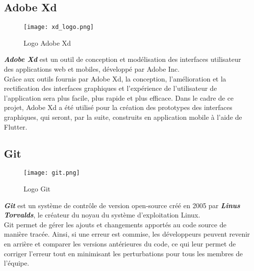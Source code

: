 \subsection{Adobe Xd}
\vspace{1cm}
\begin{figure}[H]
    \centering
    \texttt{[image: xd\_logo.png]}
    \vspace{1cm}
    \captionsetup{justification=centering}

    \caption{Logo Adobe Xd}
    \label{fig:xd_logo}
\end{figure}
\textit{\textbf{Adobe Xd}} \cite{adobe_xd} est un outil de conception et modélisation des interfaces utilisateur des applications web et mobiles, développé par Adobe Inc.\\
\noindent Grâce aux outils fournis par Adobe Xd, la conception, l'amélioration et la rectification des interfaces graphiques et l'expérience de l'utilisateur de l'application sera plus facile, plus rapide et plus efficace.
\noindent Dans le cadre de ce projet, Adobe Xd a été utilisé pour la création des prototypes des interfaces graphiques, qui seront, par la suite, construits en application mobile à l'aide de Flutter.
\subsection{Git}
\vspace{1cm}
\begin{figure}[H]
    \centering
    \texttt{[image: git.png]}
    \vspace{1cm}
    \captionsetup{justification=centering}

    \caption{Logo Git}
    \label{fig:git_logo}
\end{figure}
\textit{\textbf{Git}} \cite{git} est un système de contrôle de version open-source créé en 2005 par \textit{\textbf{Linus Torvalds}}, le créateur du noyau du système d'exploitation Linux.\\
\noindent Git permet de gérer les ajouts et changements apportés au code source de manière tracée. Ainsi, si une erreur est commise, les développeurs peuvent revenir en arrière et comparer les versions antérieures du code, ce qui leur permet de corriger l'erreur tout en minimisant les perturbations pour tous les membres de l'équipe.
